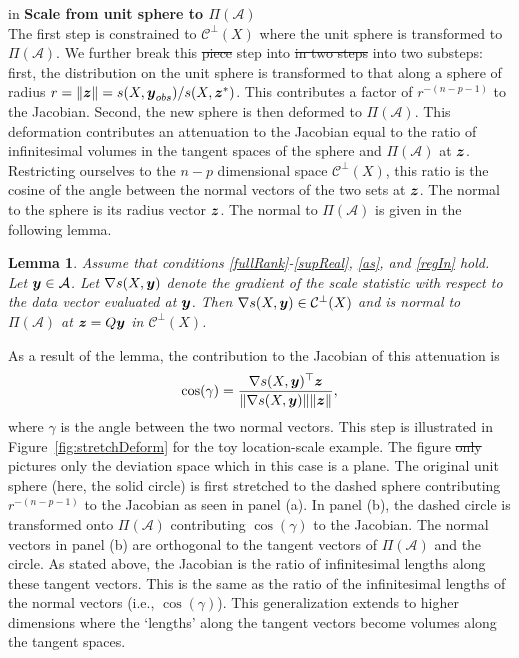 \documentclass[11pt]{article}
\newcommand{\by}{\mbox{\boldmath $y$}}
\newcommand{\bz}{\mbox{\boldmath $z$}}
\newcommand{\mc}{\mathcal}
\newtheorem{lemma}[theorem]{\bf Lemma}
\newcommand{\green}[1]{{\color{green}#1}}
\begin{document}
 in
\noindent
{\bf Scale from unit sphere to $\Pi(\mathcal{A})$} \\
The first step is constrained to $\mc{C}^\perp(X)$ where the unit sphere is transformed to $\Pi(\mathcal{A})$. We further break this \green{\sout{piece} step into \sout{in two steps} into two substeps}: first, the distribution on the unit sphere is transformed to that along a sphere of radius $r=\|\bz\|={s(X,\boldsymbol{y}_{obs})}/{s(X, \boldsymbol{z}^{*})}$. This contributes \green{a factor of} $r^{-(n-p-1)}$ to the Jacobian. Second, the new sphere is then deformed to $\Pi(\mathcal{A})$.  This deformation contributes an attenuation to the Jacobian equal to the
ratio of infinitesimal volumes in the
tangent spaces of the sphere and $\Pi(\mathcal{A})$ at $\bz$.  
Restricting ourselves to the $n-p$ dimensional space $\mc{C}^\perp(X)$, this
ratio is the cosine of the angle between the normal 
vectors of the two sets at $\bz$.  The normal to the sphere is its radius vector $\bz$. The normal to
$\Pi(\mathcal{A})$ is given in the following lemma.  

\begin{lemma}
\label{gradSTheoremReg}
Assume that conditions \ref{fullRank}-\ref{supReal}, \ref{as}, and \ref{regIn} hold.  
Let $\by\in \mathcal{A}$. Let 
$\nabla s(X,\by)$ denote the
gradient of the scale statistic with respect to the data vector evaluated at
$\by$.  Then $\nabla s(X,\by)\in \mc{C}^\perp(X)$ and is 
normal to $\Pi(\mathcal{A})$ at $\bz=Q\by$  in $\mc{C}^\perp(X)$.
\end{lemma}

As a result of the lemma, the contribution to the  Jacobian of this attenuation is 
\begin{equation}
\label{cosine}
\cos(\gamma)=\frac{\nabla s(X,\by)^\top \bz}{\|\nabla
s(X,\by)\| \|\bz\|},
\end{equation}
where $\gamma$ is the angle between the two normal vectors.
This step is illustrated in Figure~\ref{fig:stretchDeform} for the toy
location-scale example.  The figure \green{\sout{only}} pictures \green{only} the deviation space
which in this case is a plane. The original unit  sphere (here, the
solid circle) is first stretched to the dashed sphere contributing
$r^{-(n-p-1)}$ to the Jacobian as seen in panel (a). In panel (b), the
dashed circle is transformed onto $\Pi(\mc A)$ contributing
$\cos(\gamma)$ to the Jacobian. The normal vectors in panel (b) are
orthogonal to the tangent vectors of $\Pi(\mc A)$ and the circle. As
stated above, the Jacobian is the ratio of infinitesimal lengths along these tangent vectors. This is the same as the ratio of the infinitesimal lengths of the normal vectors (i.e., $\cos(\gamma)$). This generalization extends to higher dimensions where the `lengths' along the tangent vectors become volumes along the tangent spaces. 
\end{document}
